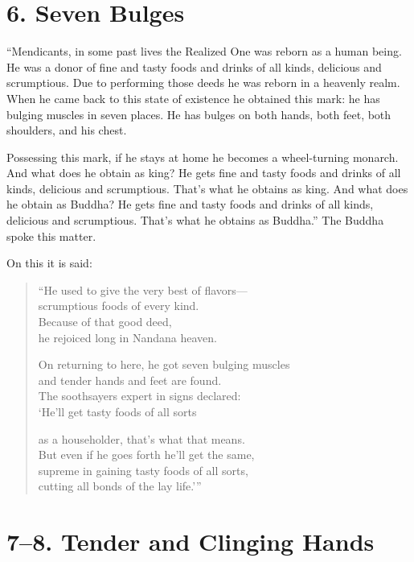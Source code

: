\documentclass[12pt,openany]{book}%
\begin{document}
\section*{6. Seven Bulges }

“Mendicants, in some past lives the Realized One was reborn as a human being. He was a donor of fine and tasty foods and drinks of all kinds, delicious and scrumptious. Due to performing those deeds he was reborn in a heavenly realm. When he came back to this state of existence he obtained this mark: he has bulging muscles in seven places. He has bulges on both hands, both feet, both shoulders, and his chest. 

Possessing this mark, if he stays at home he becomes a wheel-turning monarch. And what does he obtain as king? He gets fine and tasty foods and drinks of all kinds, delicious and scrumptious. That’s what he obtains as king. And what does he obtain as Buddha? He gets fine and tasty foods and drinks of all kinds, delicious and scrumptious. That’s what he obtains as Buddha.” The Buddha spoke this matter. 

On this it is said: 

\begin{verse}%
“He used to give the very best of flavors—\\
scrumptious foods of every kind. \\
Because of that good deed, \\
he rejoiced long in Nandana heaven. 

On returning to here, he got seven bulging muscles \\
and tender hands and feet are found. \\
The soothsayers expert in signs declared: \\
‘He’ll get tasty foods of all sorts 

as a householder, that’s what that means. \\
But even if he goes forth he’ll get the same, \\
supreme in gaining tasty foods of all sorts, \\
cutting all bonds of the lay life.’” 

%
\end{verse}

\section*{7–8. Tender and Clinging Hands }
\end{document}
